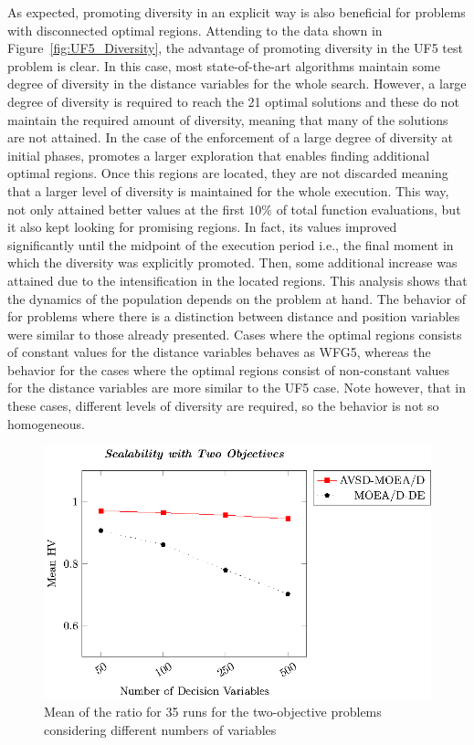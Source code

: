 As expected, promoting diversity in an explicit way is also beneficial for problems with disconnected optimal regions.
%
Attending to the data shown in Figure~\ref{fig:UF5_Diversity}, the advantage of promoting diversity in the UF5 test 
problem is clear.
%
In this case, most state-of-the-art algorithms maintain some degree of diversity in the distance variables for
the whole search.
%
However, a large degree of diversity is required to reach the 21 optimal solutions and these \MOEAS{} do not maintain
the required amount of diversity, meaning that many of the solutions are not attained.
%
In the case of \AVSDMOEAD{} the enforcement of a large degree of diversity at initial phases, promotes a larger exploration 
that enables finding additional optimal regions.
%
Once this regions are located, they are not discarded meaning that a larger level of diversity is maintained for the whole
execution.
%
This way, \AVSDMOEAD{} not only attained better \HV{} values at the first $10\%$ of total function evaluations, but 
it also kept looking for promising regions.
%
In fact, its \HV{} values improved significantly until the midpoint of the execution period i.e., the final moment
in which the diversity was explicitly promoted.
%
Then, some additional increase was attained due to the intensification in the located regions.
%
This analysis shows that the dynamics of the population depends on the problem at hand.
%
The behavior of \AVSDMOEAD{} for problems where there is a distinction between distance and position variables 
were similar to those already presented.
%
Cases where the optimal regions consists of constant values for the distance variables behaves as WFG5, whereas
the behavior for the cases where the optimal regions consist of non-constant values for the distance variables are
more similar to the UF5 case.
%
Note however, that in these cases, different levels of diversity are required, so the behavior is not so homogeneous.

\begin{figure}[t]
\centering
\includegraphics[scale=0.70]{images/Graphic-Scalability-2obj_tikz-figure0.eps}
\caption{Mean of the \HV{} ratio for 35 runs for the two-objective problems considering different numbers of variables}\label{fig:scalability-2obj}
\end{figure}


